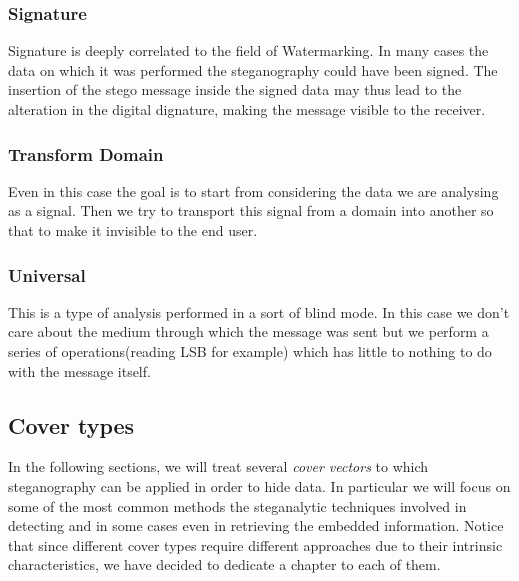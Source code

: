 \documentclass[../../main.tex]{subfiles}
\begin{document}
    \subsubsection{Signature}
    Signature is deeply correlated to the field of Watermarking. In many cases
    the data on which it was performed the steganography could have been signed.
    The insertion of the stego message inside the signed data may thus lead to
    the alteration in the digital dignature, making the message visible to the
    receiver.
    
    \subsubsection{Transform Domain}
    Even in this case the goal is to start from considering the data we are
    analysing as a signal. Then we try to transport this signal from a domain
    into another so that to make it invisible to the end user.
    
    \subsubsection{Universal}
    This is a type of analysis performed in a sort of blind mode. In this case
    we don't care about the medium through which the message was sent but we
    perform a series of operations(reading LSB for example) which has little to
    nothing to do with the message itself.

    \subsection{Cover types}
    In the following sections, we will treat several \emph{cover vectors} to which
    steganography can be applied in order to hide data.
    In particular we will focus on some of the most common methods the steganalytic techniques involved in detecting and in some cases
    even in retrieving the embedded information.
    Notice that since different cover types require different approaches
    due to their intrinsic characteristics, we have decided to dedicate a chapter to each of them. 
    
\end{document}
